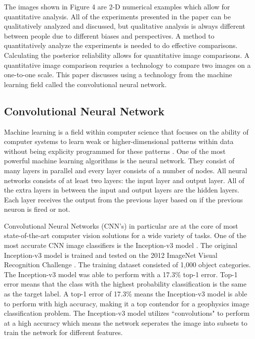 The images shown in Figure 4 are 2-D numerical examples which allow for quantitative analysis. All of the experiments presented in the paper can be qualitatively analyzed and discussed, but qualitative analysis is always different between people due to different biases and perspectives. A method to quantitatively analyze the experiments is needed to do effective comparisons. Calculating the posterior reliability allows for quantitative image comparisons. A quantitative image comparison requries a technology to compare two images on a one-to-one scale. This paper discusses using a technology from the machine learning field called the convolutional neural network.

\subsection{Convolutional Neural Network}
Machine learning is a field within computer science that focuses on the ability of computer systems to learn weak or higher-dimensional patterns within data without being explicity programmed for these patterns \citep{samuel1959some}. One of the most powerful machine learning algorithms is the neural network. They consist of many layers in parallel and every layer consists of a number of nodes. All neural networks consists of at least two layers: the input layer and output layer. All of the extra layers in between the input and output layers are the hidden layers. Each layer receives the output from the previous layer based on if the previous neuron is fired or not.

Convolutional Neural Networks (CNN's) in particular are at the core of most state-of-the-art computer vision solutions for a wide variety of tasks. One of the most accurate CNN image classifiers is the Inception-v3 model \citep{Szegedy2015}. The original Inception-v3 model is trained and tested on the 2012 ImageNet Visual Recognition Challenge \citep{ILSVRC15}. The training dataset consisted of 1,000 object categories. The Inception-v3 model was able to perform with a 17.3\% top-1 error. Top-1 error means that the class with the highest probability classification is the same as the target label. A top-1 error of 17.3\% means the Inception-v3 model is able to perform with high accuracy, making it a top contendor for a geophysics image classification problem. The Inception-v3 model utilizes ``convolutions" to perform at a high accuracy which means the network seperates the image into subsets to train the network for different features.

